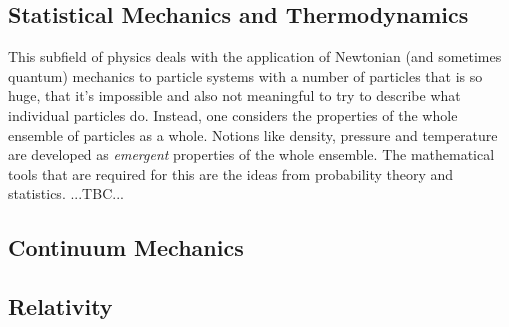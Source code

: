 
\subsection{Statistical Mechanics and Thermodynamics}
This subfield of physics deals with the application of Newtonian (and sometimes quantum) mechanics to particle systems with a number of particles that is so huge, that it's impossible and also not meaningful to try to describe what individual particles do. Instead, one considers the properties of the whole ensemble of particles as a whole. Notions like density, pressure and temperature are developed as \emph{emergent} properties of the whole ensemble. The mathematical tools that are required for this are the ideas from probability theory and statistics. ...TBC...




\subsection{Continuum Mechanics}






\subsection{Relativity}





